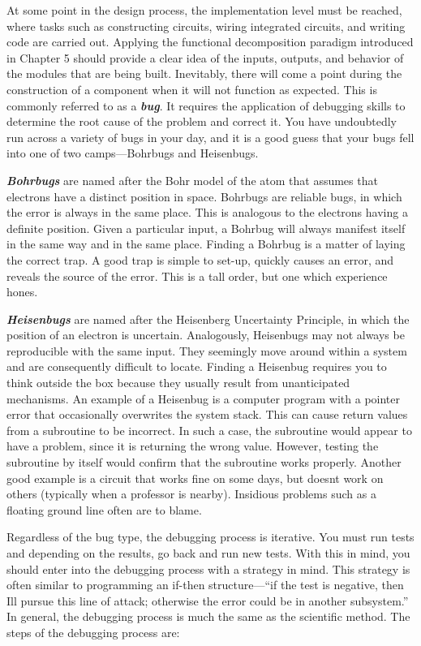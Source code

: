 At some point in the design process, the implementation level must be
reached, where tasks such as constructing circuits, wiring integrated
circuits, and writing code are carried out. Applying the functional
decomposition paradigm introduced in Chapter 5 should provide a clear
idea of the inputs, outputs, and behavior of the modules that are being
built. Inevitably, there will come a point during the construction of a
component when it will not function as expected. This is commonly
referred to as a \emph{\textbf{bug}}. It requires the application of
debugging skills to determine the root cause of the problem and correct
it. You have undoubtedly run across a variety of bugs in your day, and
it is a good guess that your bugs fell into one of two camps---Bohrbugs
and Heisenbugs.

\emph{\textbf{Bohrbugs}} are named after the Bohr model of the atom that
assumes that electrons have a distinct position in space. Bohrbugs are
reliable bugs, in which the error is always in the same place. This is
analogous to the electrons having a definite position. Given a
particular input, a Bohrbug will always manifest itself in the same way
and in the same place. Finding a Bohrbug is a matter of laying the
correct trap. A good trap is simple to set-up, quickly causes an error,
and reveals the source of the error. This is a tall order, but one which
experience hones.

\emph{\textbf{Heisenbugs}} are named after the Heisenberg Uncertainty
Principle, in which the position of an electron is uncertain.
Analogously, Heisenbugs may not always be reproducible with the same
input. They seemingly move around within a system and are consequently
difficult to locate. Finding a Heisenbug requires you to think outside
the box because they usually result from unanticipated mechanisms. An
example of a Heisenbug is a computer program with a pointer error that
occasionally overwrites the system stack. This can cause return values
from a subroutine to be incorrect. In such a case, the subroutine would
appear to have a problem, since it is returning the wrong value.
However, testing the subroutine by itself would confirm that the
subroutine works properly. Another good example is a circuit that works
fine on some days, but doesn\textquotesingle t work on others (typically
when a professor is nearby). Insidious problems such as a floating
ground line often are to blame.

Regardless of the bug type, the debugging process is iterative. You must
run tests and depending on the results, go back and run new tests. With
this in mind, you should enter into the debugging process with a
strategy in mind. This strategy is often similar to programming an
if-then structure---``if the test is negative, then I\textquotesingle ll
pursue this line of attack; otherwise the error could be in another
subsystem.'' In general, the debugging process is much the same as the
scientific method. The steps of the debugging process are:

